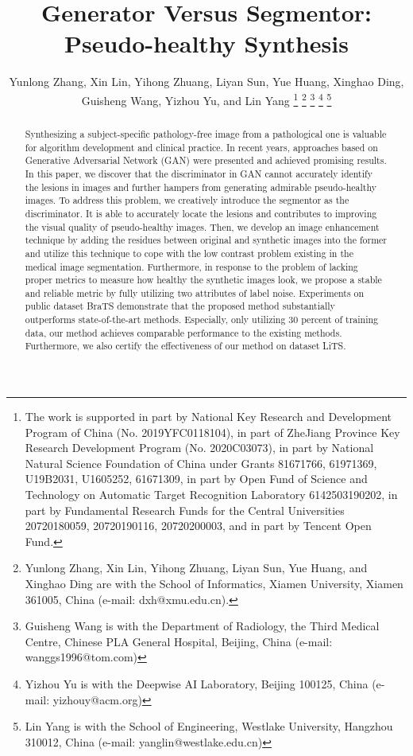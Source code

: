 \documentclass[journal,twoside,web]{ieeecolor}
\begin{document}
\title{Generator Versus Segmentor: Pseudo-healthy Synthesis}
\author{Yunlong Zhang, Xin Lin, Yihong Zhuang, Liyan Sun, Yue Huang, Xinghao Ding, Guisheng Wang, Yizhou Yu,  and Lin Yang
\thanks{The work is supported in part by National Key Research and Development Program of China (No. 2019YFC0118104), in part of ZheJiang Province Key Research Development Program (No. 2020C03073), in part by National Natural Science Foundation of China under Grants 81671766, 61971369, U19B2031, U1605252, 61671309, in part by Open Fund of Science and Technology on Automatic Target Recognition Laboratory 6142503190202, in part by Fundamental Research Funds for the Central Universities 20720180059, 20720190116, 20720200003, and in part by Tencent Open Fund.}
\thanks{Yunlong Zhang, Xin Lin, Yihong Zhuang, Liyan Sun, Yue Huang, and Xinghao Ding are with the
School of Informatics, Xiamen University, Xiamen 361005, China (e-mail:
dxh@xmu.edu.cn). }
\thanks{Guisheng Wang is with the Department of Radiology, the Third Medical Centre, Chinese PLA General Hospital, Beijing, China
(e-mail: wanggs1996@tom.com)}
\thanks{Yizhou Yu is with the Deepwise AI Laboratory, Beijing 100125, China
(e-mail: yizhouy@acm.org)}
\thanks{Lin Yang is with the School of Engineering, Westlake University, Hangzhou 310012, China
	(e-mail: yanglin@westlake.edu.cn)}
}

\maketitle

\begin{abstract}
Synthesizing a subject-specific pathology-free image from a pathological one is valuable for algorithm development and clinical practice. In recent years, approaches based on Generative Adversarial Network (GAN) were presented and achieved promising results. In this paper, we discover that the discriminator in GAN cannot accurately identify the lesions in images and further hampers from generating admirable pseudo-healthy images. To address this problem, we creatively introduce the segmentor as the discriminator. It is able to accurately locate the lesions and contributes to improving the visual quality of pseudo-healthy images. Then, we develop an image enhancement technique by adding the residues between original and synthetic images into the former and utilize this technique to cope with the low contrast problem existing in the medical image segmentation. Furthermore, in response to the problem of lacking proper metrics to measure how healthy the synthetic images look, we propose a stable and reliable metric by fully utilizing two attributes of label noise. Experiments on public dataset BraTS demonstrate that the proposed method substantially outperforms state-of-the-art methods. Especially, only utilizing 30 percent of training data, our method achieves comparable performance to the existing methods. Furthermore, we also certify the effectiveness of our method on dataset LiTS.
\end{abstract}
\end{document}
